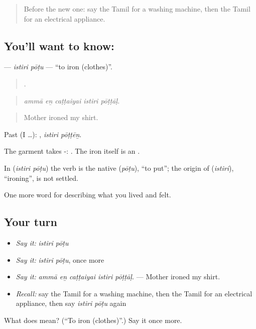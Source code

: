 \label{lesson:TA-C520-istiri-potu}



\begin{quote}
Before the new one: say the Tamil for a washing machine, then the Tamil for an electrical appliance.
\end{quote}

\subsection*{You'll want to know:  }
\textbf{ } — \emph{istiri pōṭu} — \textquotedblleft{}to iron (clothes)\textquotedblright{}.

\begin{quote}
    .
\end{quote}

\begin{quote}
\emph{ammā eṉ caṭṭaiyai istiri pōṭṭāḷ.}
\end{quote}

\begin{quote}
Mother ironed my shirt.
\end{quote}

Past (I …):  , \emph{istiri pōṭṭēṉ}.

The garment takes -:   . The iron itself is an  .

\begin{cousinweb}
In \textbf{ } (\emph{istiri pōṭu}) the verb is the native  (\emph{pōṭu}), \textquotedblleft{}to put\textquotedblright{}; the origin of  (\emph{istiri}), \textquotedblleft{}ironing\textquotedblright{}, is not settled.
\end{cousinweb}

\begin{grammarlens}[title={What you've built}]
One more word for describing what you lived and felt.
\end{grammarlens}

\subsection*{Your turn}
\begin{itemize}
\raggedright
  \item \emph{Say it:} \emph{istiri pōṭu}
  \item \emph{Say it:} \emph{istiri pōṭu}, once more
  \item \emph{Say it:} \emph{ammā eṉ caṭṭaiyai istiri pōṭṭāḷ.} — Mother ironed my shirt.
  \item \emph{Recall:} say the Tamil for a washing machine, then the Tamil for an electrical appliance, then say \emph{istiri pōṭu} again
\end{itemize}

\begin{tcolorbox}[breakable,colback=teal!4,colframe=teal!35!black,title={Before you move on}]
What does   mean? (\textquotedblleft{}To iron (clothes)\textquotedblright{}.) Say it once more.
\end{tcolorbox}
